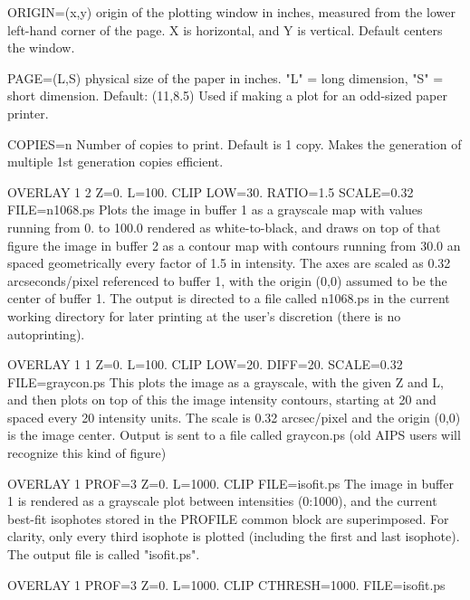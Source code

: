 {\begin{command}
  \item[ORIGIN=(x,y)]{origin of the plotting window in inches, measured from 
                  the lower left-hand corner of the page.  X is horizontal, 
                  and Y is vertical.  Default centers the window.}
  \item[PAGE=(L,S)]{physical size of the paper in inches.  "L" = long 
                  dimension, "S" = short dimension.  Default: (11,8.5)
                  Used if making a plot for an odd-sized paper printer.}
  \item[COPIES=n]{Number of copies to print.  Default is 1 copy.  Makes the
                  generation of multiple 1st generation copies efficient.}
\end{command}%
\lthtmlfigureZ
\lthtmlcheckvsize\clearpage}

{\newpage\clearpage
{}%
\begin{example}
  \item[OVERLAY 1 2 Z=0. L=100. CLIP LOW=30. RATIO=1.5 SCALE=0.32 FILE=n1068.ps\hfill]{
   Plots the image in buffer 1 as a grayscale map with values running from
   0. to 100.0 rendered as white-to-black, and draws on top of that figure
   the image in buffer 2 as a contour map with contours running from 30.0
   an spaced geometrically every factor of 1.5 in intensity.  The axes
   are scaled as 0.32 arcseconds/pixel referenced to buffer 1, with the
   origin (0,0) assumed to be the center of buffer 1.  The output is
   directed to a file called n1068.ps in the current working directory
   for later printing at the user's discretion (there is no autoprinting).}
  \item[OVERLAY 1 1 Z=0. L=100. CLIP LOW=20. DIFF=20. SCALE=0.32 FILE=graycon.ps\hfill]{
   This plots the image as a grayscale, with the given Z and L, and then
   plots on top of this the image intensity contours, starting at 20 and
   spaced every 20 intensity units.  The scale is 0.32 arcsec/pixel and
   the origin (0,0) is the image center.  Output is sent to a file
   called graycon.ps  (old AIPS users will recognize this kind of figure)}
  \item[OVERLAY 1 PROF=3 Z=0. L=1000. CLIP FILE=isofit.ps\hfill]{
   The image in buffer 1 is rendered as a grayscale plot between
   intensities (0:1000), and the current best-fit isophotes stored in
   the PROFILE common block are superimposed.  For clarity, only every 
   third isophote is  plotted (including the first and last isophote).
   The output file is called "isofit.ps".}
  \item[OVERLAY 1 PROF=3 Z=0. L=1000. CLIP CTHRESH=1000. FILE=isofit.ps\hfill]{}

\end{example}}
